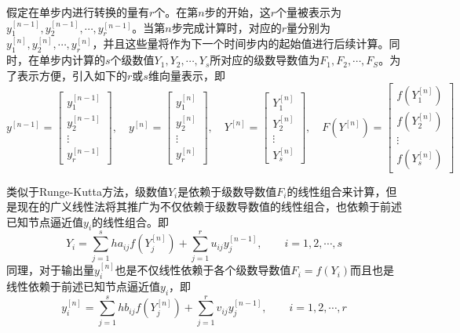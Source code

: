 假定在单步内进行转换的量有$r$个。在第$n$步的开始，这$r$个量被表示为$y_1^{[n-1]},y_2^{[n-1]},\cdots,y_r^{[n-1]}$。当第$n$步完成计算时，对应的$r$量分别为$y_1^{[n]},y_2^{[n]},\cdots,y_r^{[n]}$，并且这些量将作为下一个时间步内的起始值进行后续计算。同时，在单步内计算的$s$个级数值$Y_1,Y_2,\cdots,Y_s$所对应的级数导数值为$F_1,F_2,\cdots,F_S$。为了表示方便，引入如下的$r$或$s$维向量表示，即
\begin{equation}
y^{[n-1]}=\begin{bmatrix}
y_1^{[n-1]}\\
y_2^{[n-1]}\\
\vdots\\
y_r^{[n-1]}
\end{bmatrix},\quad
y^{[n]}=\begin{bmatrix}
y_1^{[n]}\\
y_2^{[n]}\\
\vdots\\
y_r^{[n]}
\end{bmatrix},\quad
Y^{[n]}=\begin{bmatrix}
Y_1^{[n]}\\
Y_2^{[n]}\\
\vdots\\
Y_s^{[n]}
\end{bmatrix},\quad
F(Y^{[n]})=\begin{bmatrix}
f(Y_1^{[n]})\\
f(Y_2^{[n]})\\
\vdots\\
f(Y_s^{[n]})
\end{bmatrix}
\end{equation}

类似于Runge-Kutta方法，级数值$Y_i$是依赖于级数导数值$F_i$的线性组合来计算，但是现在的广义线性法将其推广为不仅依赖于级数导数值的线性组合，也依赖于前述已知节点逼近值$y_i$的线性组合。即
\begin{equation}
Y_i=\sum_{j=1}^{s}ha_{ij}f(Y_j^{[n]})+\sum_{j=1}^{r}u_{ij}y_j^{[n-1]},\qquad i=1,2,\cdots,s
\end{equation}
同理，对于输出量$y_i^{[n]}$也是不仅线性依赖于各个级数导数值$F_i=f(Y_i)$而且也是线性依赖于前述已知节点逼近值$y_i$，即
\begin{equation}
y_i^{[n]}=\sum_{j=1}^{s}hb_{ij}f(Y_j^{[n]})+\sum_{j=1}^{r}v_{ij}y_j^{[n-1]},\qquad i=1,2,\cdots,r
\end{equation}

